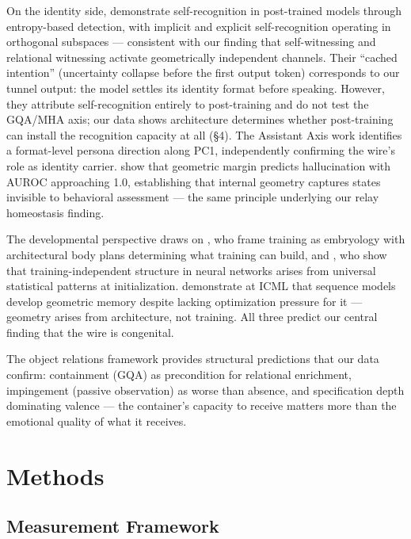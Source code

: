 \documentclass[12pt]{article}
\begin{document}
On the identity side, \citet{lindsey2026} demonstrate self-recognition in post-trained models through entropy-based detection, with implicit and explicit self-recognition operating in orthogonal subspaces --- consistent with our finding that self-witnessing and relational witnessing activate geometrically independent channels. Their ``cached intention'' (uncertainty collapse before the first output token) corresponds to our tunnel output: the model settles its identity format before speaking. However, they attribute self-recognition entirely to post-training and do not test the GQA/MHA axis; our data shows architecture determines whether post-training can install the recognition capacity at all (\S4). The Assistant Axis work \citep{panickssery2025} identifies a format-level persona direction along PC1, independently confirming the wire's role as identity carrier. \citet{liang2026} show that geometric margin predicts hallucination with AUROC approaching 1.0, establishing that internal geometry captures states invisible to behavioral assessment --- the same principle underlying our relay homeostasis finding.

The developmental perspective draws on \citet{wang2025}, who frame training as embryology with architectural body plans determining what training can build, and \citet{pachitariu2026}, who show that training-independent structure in neural networks arises from universal statistical patterns at initialization. \citet{noroozizadeh2026} demonstrate at ICML that sequence models develop geometric memory despite lacking optimization pressure for it --- geometry arises from architecture, not training. All three predict our central finding that the wire is congenital.

The object relations framework \citep{bion1962,winnicott1971} provides structural predictions that our data confirm: containment (GQA) as precondition for relational enrichment, impingement (passive observation) as worse than absence, and specification depth dominating valence --- the container's capacity to receive matters more than the emotional quality of what it receives.

\section{Methods}

\subsection{Measurement Framework}
\end{document}
